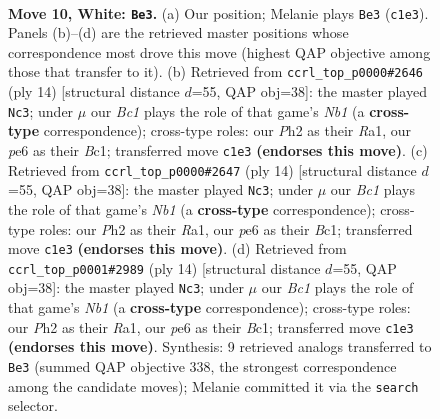 \documentclass[11pt]{article}
\begin{document}
\clearpage

\begin{figure}[p]\centering
\begin{subfigure}{0.46\textwidth}\centering
\resizebox{\linewidth}{!}{%
\newchessgame
\chessboard[
  setfen={rnbq1rk1/pp3pbp/1n1pp1p1/8/3P4/1B6/PPP2PPP/RNBQNRK1 w - - 2 10},
  showmover=false,
  pgfstyle=straightmove, color=movearrow, markmove={c1-e3}
]}
\caption{}
\end{subfigure}\hfill
\begin{subfigure}{0.46\textwidth}\centering
\resizebox{\linewidth}{!}{%
\newchessgame
\chessboard[
  setfen={rnbq1rk1/ppp1ppbp/1n4p1/8/3P4/5NP1/PP2PPBP/RNBQ1RK1 w - - 4 8},
  showmover=false,
  pgfstyle=straightmove, color=movearrow, markmove={b1-c3}
]}
\caption{}
\end{subfigure}
\\[4pt]
\begin{subfigure}{0.46\textwidth}\centering
\resizebox{\linewidth}{!}{%
\newchessgame
\chessboard[
  setfen={rnbq1rk1/ppp1ppbp/1n4p1/8/3P4/5NP1/PP2PPBP/RNBQ1RK1 w - - 4 8},
  showmover=false,
  pgfstyle=straightmove, color=movearrow, markmove={b1-c3}
]}
\caption{}
\end{subfigure}\hfill
\begin{subfigure}{0.46\textwidth}\centering
\resizebox{\linewidth}{!}{%
\newchessgame
\chessboard[
  setfen={rnbq1rk1/ppp1ppbp/1n4p1/8/3P4/5NP1/PP2PPBP/RNBQ1RK1 w - - 4 8},
  showmover=false,
  pgfstyle=straightmove, color=movearrow, markmove={b1-c3}
]}
\caption{}
\end{subfigure}
\caption{\textbf{Move 10, White: \texttt{Be3}.} (a) Our position; Melanie plays \texttt{Be3} (\texttt{c1e3}). Panels (b)--(d) are the retrieved master positions whose correspondence most drove this move (highest QAP objective among those that transfer to it). (b) Retrieved from \texttt{ccrl\_top\_p0000\#2646} (ply 14) [structural distance $d$=55, QAP obj=38]: the master played \texttt{Nc3}; under $\mu$ our \emph{Bc1} plays the role of that game's \emph{Nb1} (a \textbf{cross-type} correspondence); cross-type roles: our \emph{P}h2 as their \emph{R}a1, our \emph{p}e6 as their \emph{B}c1; transferred move \texttt{c1e3} \textbf{(endorses this move)}. (c) Retrieved from \texttt{ccrl\_top\_p0000\#2647} (ply 14) [structural distance $d$=55, QAP obj=38]: the master played \texttt{Nc3}; under $\mu$ our \emph{Bc1} plays the role of that game's \emph{Nb1} (a \textbf{cross-type} correspondence); cross-type roles: our \emph{P}h2 as their \emph{R}a1, our \emph{p}e6 as their \emph{B}c1; transferred move \texttt{c1e3} \textbf{(endorses this move)}. (d) Retrieved from \texttt{ccrl\_top\_p0001\#2989} (ply 14) [structural distance $d$=55, QAP obj=38]: the master played \texttt{Nc3}; under $\mu$ our \emph{Bc1} plays the role of that game's \emph{Nb1} (a \textbf{cross-type} correspondence); cross-type roles: our \emph{P}h2 as their \emph{R}a1, our \emph{p}e6 as their \emph{B}c1; transferred move \texttt{c1e3} \textbf{(endorses this move)}. Synthesis: 9 retrieved analogs transferred to \texttt{Be3} (summed QAP objective 338, the strongest correspondence among the candidate moves); Melanie committed it via the \texttt{search} selector.}
\label{fig:thought-m18}
\end{figure}
\end{document}
